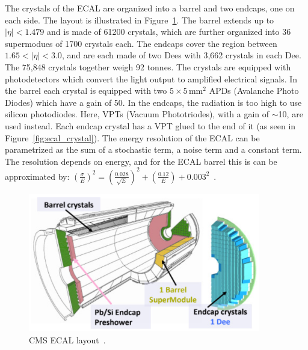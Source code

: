 The crystals of the ECAL are organized into a barrel and two endcaps, one on each side. The layout is illustrated in Figure~\ref{fig:ecal_layout}. The barrel extends up to $|\eta|<1.479$ and is made of 61200 crystals, which are further organized into 36 supermodues of 1700 crystals each. The endcaps cover the region between  $1.65<|\eta|<3.0$, and are each made of two Dees with 3,662 crystals in each Dee. The 75,848 crystals together weigh 92 tonnes. The crystals are equipped with photodetectors which convert the light output to amplified electrical signals. In the barrel each crystal is equipped with two $5\times5\,\mathrm{mm}^2$ APDs (Avalanche Photo Diodes) which have a gain of 50. In the endcaps, the radiation is too high to use silicon photodiodes. Here, VPTs (Vacuum Phototriodes), with a gain of $\sim$10, are used instead. Each endcap crystal has a VPT glued to the end of it (as seen in Figure~\ref{fig:ecal_crystal}). The energy resolution of the ECAL can be parametrized as the sum of a stochastic term, a noise term and a constant term. The resolution depends on energy, and for the ECAL barrel this is can be approximated by: $(\frac{\sigma}{E})^2=(\frac{0.028}{\sqrt{E}})^2+(\frac{0.12}{E})+0.003^2$~\cite{ecal3}.

\begin{figure}
\begin{center}
  \includegraphics[width=0.9\textwidth,keepaspectratio]{plots_and_figures/chapter3/ecal_layout.png}
\caption{CMS ECAL layout~\cite{ecal2}.}
\label{fig:ecal_layout}
\end{center}
\end{figure}

